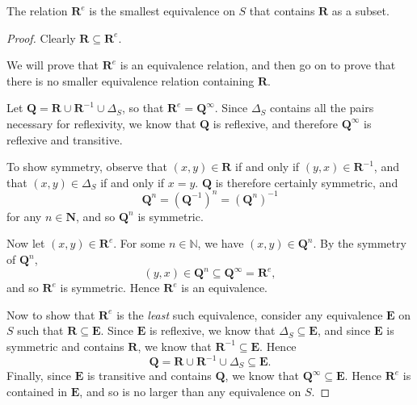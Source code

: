 \begin{lemma}
  \label{lem:re}
  The relation $\mathbf{R}^e$ is the smallest equivalence on $S$ that contains
  $\mathbf{R}$ as a subset.
  \begin{proof}
    Clearly $\mathbf{R} \subseteq \mathbf{R}^e$.

    We will prove that $\mathbf{R}^e$ is an equivalence relation, and then
    go on to prove that there is no smaller equivalence relation containing
    $\mathbf{R}$.

    Let $\mathbf{Q} = \mathbf{R} \cup \mathbf{R}^{-1} \cup \Delta_S$, so that
    $\mathbf{R}^e = \mathbf{Q}^\infty$.  Since $\Delta_S$ contains all the
    pairs necessary for reflexivity, we know that $\mathbf{Q}$ is reflexive,
    and therefore $\mathbf{Q}^\infty$ is reflexive and transitive.

    To show symmetry, observe that $(x,y) \in \mathbf{R}$ if and only if $(y,x)
    \in \mathbf{R}^{-1}$, and that $(x,y) \in \Delta_S$ if and only if $x=y$.
    $\mathbf{Q}$ is therefore certainly symmetric, and
    $$\mathbf{Q}^n = (\mathbf{Q}^{-1})^n = (\mathbf{Q}^n)^{-1}$$
    for any $n \in \mathbf{N}$,
    and so $\mathbf{Q}^n$ is symmetric.

    Now let $(x,y) \in \mathbf{R}^e$.  For some $n \in \mathbb{N}$, we have
    $(x,y) \in \mathbf{Q}^n$.  By the symmetry of $\mathbf{Q}^n$,
    $$(y,x) \in \mathbf{Q}^n \subseteq \mathbf{Q}^\infty = \mathbf{R}^e,$$
    and so $\mathbf{R}^e$ is symmetric.  Hence $\mathbf{R}^e$ is an equivalence.

    Now to show that $\mathbf{R}^e$ is the \textit{least} such equivalence,
    consider any equivalence $\mathbf{E}$ on $S$ such that $\mathbf{R} \subseteq
    \mathbf{E}$.  Since $\mathbf{E}$ is reflexive, we know that $\Delta_S
    \subseteq \mathbf{E}$, and since $\mathbf{E}$ is symmetric and contains
    $\mathbf{R}$, we know that $\mathbf{R}^{-1} \subseteq \mathbf{E}$.  Hence
    $$\mathbf{Q}=\mathbf{R}\cup\mathbf{R}^{-1}\cup\Delta_S \subseteq \mathbf{E}.$$
    Finally, since $\mathbf{E}$ is transitive and contains $\mathbf{Q}$, we know
    that $\mathbf{Q}^\infty \subseteq \mathbf{E}$.  Hence $\mathbf{R}^e$ is
    contained in $\mathbf{E}$, and so is no larger than any equivalence on $S$.
  \end{proof}
\end{lemma}

